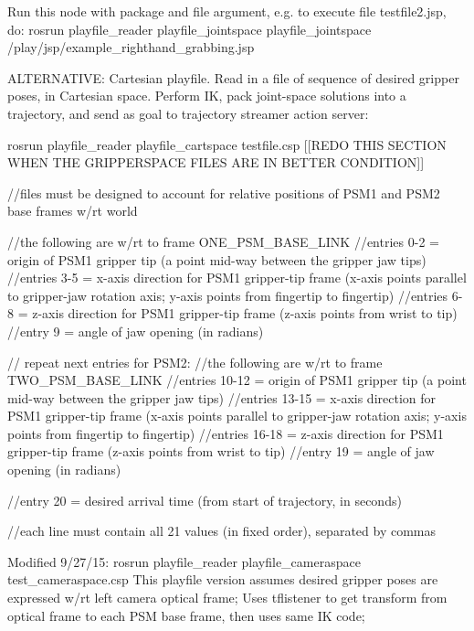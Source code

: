 Run this node with package and file argument, e.\-g. to execute file testfile2.\-jsp, do\-: {\ttfamily rosrun playfile\-\_\-reader playfile\-\_\-jointspace playfile\-\_\-jointspace /play/jsp/example\-\_\-righthand\-\_\-grabbing.jsp}

A\-L\-T\-E\-R\-N\-A\-T\-I\-V\-E\-: Cartesian playfile. Read in a file of sequence of desired gripper poses, in Cartesian space. Perform I\-K, pack joint-\/space solutions into a trajectory, and send as goal to trajectory streamer action server\-:

{\ttfamily rosrun playfile\-\_\-reader playfile\-\_\-cartspace testfile.\-csp} \mbox{[}\mbox{[}R\-E\-D\-O T\-H\-I\-S S\-E\-C\-T\-I\-O\-N W\-H\-E\-N T\-H\-E G\-R\-I\-P\-P\-E\-R\-S\-P\-A\-C\-E F\-I\-L\-E\-S A\-R\-E I\-N B\-E\-T\-T\-E\-R C\-O\-N\-D\-I\-T\-I\-O\-N\mbox{]}\mbox{]}

//files must be designed to account for relative positions of P\-S\-M1 and P\-S\-M2 base frames w/rt world

//the following are w/rt to frame O\-N\-E\-\_\-\-P\-S\-M\-\_\-\-B\-A\-S\-E\-\_\-\-L\-I\-N\-K //entries 0-\/2 = origin of P\-S\-M1 gripper tip (a point mid-\/way between the gripper jaw tips) //entries 3-\/5 = x-\/axis direction for P\-S\-M1 gripper-\/tip frame (x-\/axis points parallel to gripper-\/jaw rotation axis; y-\/axis points from fingertip to fingertip) //entries 6-\/8 = z-\/axis direction for P\-S\-M1 gripper-\/tip frame (z-\/axis points from wrist to tip) //entry 9 = angle of jaw opening (in radians)

// repeat next entries for P\-S\-M2\-: //the following are w/rt to frame T\-W\-O\-\_\-\-P\-S\-M\-\_\-\-B\-A\-S\-E\-\_\-\-L\-I\-N\-K //entries 10-\/12 = origin of P\-S\-M1 gripper tip (a point mid-\/way between the gripper jaw tips) //entries 13-\/15 = x-\/axis direction for P\-S\-M1 gripper-\/tip frame (x-\/axis points parallel to gripper-\/jaw rotation axis; y-\/axis points from fingertip to fingertip) //entries 16-\/18 = z-\/axis direction for P\-S\-M1 gripper-\/tip frame (z-\/axis points from wrist to tip) //entry 19 = angle of jaw opening (in radians)

//entry 20 = desired arrival time (from start of trajectory, in seconds)

//each line must contain all 21 values (in fixed order), separated by commas

Modified 9/27/15\-: rosrun playfile\-\_\-reader playfile\-\_\-cameraspace test\-\_\-cameraspace.\-csp This playfile version assumes desired gripper poses are expressed w/rt left camera optical frame; Uses tflistener to get transform from optical frame to each P\-S\-M base frame, then uses same I\-K code;

